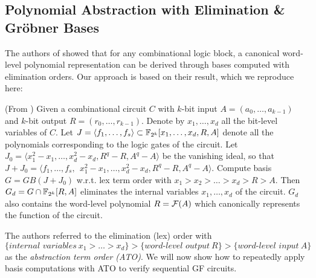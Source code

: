 \subsection{Polynomial Abstraction with Elimination \& Gr\"obner Bases}

The authors of \cite{pruss:dac14} showed that for any combinational
logic block, a canonical word-level polynomial representation can be
derived through \Grobner bases computed with elimination
orders. Our approach is based on their result, which we reproduce
here:
\begin{Lemma}
(From \cite{pruss:dac14}) Given a combinational circuit $C$ with $k$-bit
  input $A = (a_0, \dots, a_{k-1})$ and $k$-bit output $R = (r_0, \dots,
  r_{k-1})$. Denote by $x_1, \dots, x_d$ all the bit-level
  variables of   $C$. Let $J = \langle f_1, \dots, f_s \rangle \subset
  {\mathbb{F}}_{2^k}[x_1, \dots, x_d, R, A]$ denote all the polynomials corresponding to the
  logic gates of the circuit. Let $J_0 = \langle x_1^2 - x_1, \dots,
  x_d^2 - x_d, R^q - R, A^q - A \rangle$ be the vanishing ideal, so
  that $J + J_0 = \langle f_1, \dots, f_s, ~~ x_1^2 - x_1, \dots,
  x_d^2 - x_d, R^q - R, A^q - A \rangle$. Compute \Grobner basis $G =
  GB(J + J_0)$ w.r.t. lex term order with $x_1 > x_2 > \dots > x_d > R
  > A$. Then $G_d = G \cap {\mathbb{F}}_{2^k}[R, A]$ eliminates the internal
  variables $x_1, \dots, x_d$ of the circuit. $G_d$ also contains the
  word-level polynomial $R = {\mathcal{F}}(A)$ which canonically represents the
  function of the circuit.  
\end{Lemma}

The authors referred to the elimination (lex) order with
$\{\textit{internal variables} \ x_1 > \dots > x_d\} > \{\textit{word-level
  output} \ R\} > \{\textit{word-level input} \ A\}$ as the {\it abstraction
  term order (ATO)}. We will now show how to repeatedly apply \Grobner
basis computations with ATO to verify sequential GF circuits.

